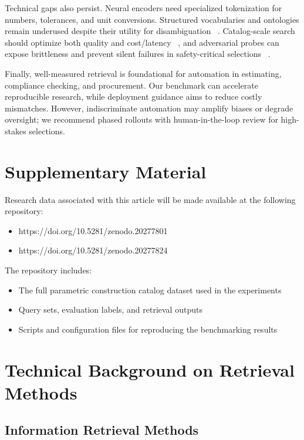\documentclass[preprint,12pt]{elsarticle}
\begin{document}
Technical gaps also persist. Neural encoders need specialized tokenization for numbers, tolerances, and unit conversions. Structured vocabularies and ontologies remain underused despite their utility for disambiguation ~\cite{yan2022overview,schlachter2021linked}. Catalog-scale search should optimize both quality and cost/latency ~\cite{bruch2023analysis}, and adversarial probes can expose brittleness and prevent silent failures in safety-critical selections ~\cite{wallace2019nlp}.

Finally, well-measured retrieval is foundational for automation in estimating, compliance checking, and procurement. Our benchmark can accelerate reproducible research, while deployment guidance aims to reduce costly mismatches. However, indiscriminate automation may amplify biases or degrade oversight; we recommend phased rollouts with human-in-the-loop review for high-stakes selections.

\appendix
\section{Supplementary Material}
\label{app:supplementary}

Research data associated with this article will be made available at the following repository:

\begin{itemize}
  \item https://doi.org/10.5281/zenodo.20277801
  \item https://doi.org/10.5281/zenodo.20277824
\end{itemize}

The repository includes:
\begin{itemize}
  \item The full parametric construction catalog dataset used in the experiments
  \item Query sets, evaluation labels, and retrieval outputs
  \item Scripts and configuration files for reproducing the benchmarking results
\end{itemize}

\section{Technical Background on Retrieval Methods}
\label{app:technical-background}

\subsection{Information Retrieval Methods}
\end{document}

